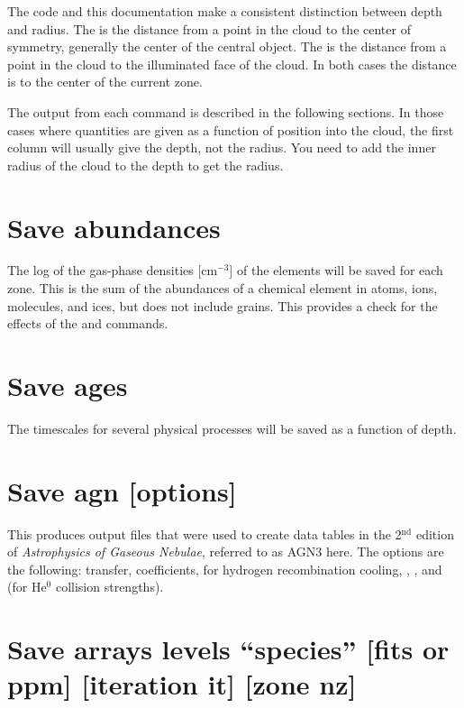 The code and this documentation make a consistent distinction between
depth and radius.
The 
is the distance from a point in the cloud to the center of symmetry,
generally the center of the central object.
The  is the distance from
a point in the cloud to the illuminated face of the cloud.
In both cases
the distance is to the center of the current zone.

The output from each  command is described in the following sections.
In those cases where quantities are given as a function of position into
the cloud, the first column will usually give the depth, not the radius.
You need to add the inner radius of the cloud to the depth to get the radius.

\section{Save abundances}

The log of the gas-phase densities [cm$^{-3}$] of the elements will be saved
for each zone.
This is the sum of the abundances of a chemical element
in atoms, ions, molecules, and ices, but does not include grains.
This provides a check for the effects of the 
and  commands.

\section{Save ages}

The timescales for several physical processes will be saved as a
function of depth.

\section{Save agn [options]}

This produces output files that were used to create data tables in the
2$^{\mathrm{nd}}$ edition of \emph{Astrophysics of Gaseous Nebulae}, referred to as AGN3 here.
The options are the following:   transfer,
 coefficients,
 for hydrogen recombination cooling, ,
, and  (for He$^0$
collision strengths).

\section{Save arrays levels ``species'' [fits or ppm] [iteration it] [zone nz]}

